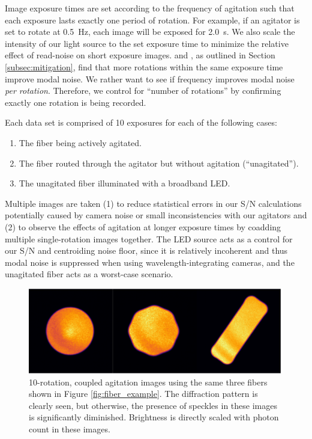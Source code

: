 Image exposure times are set according to the frequency of agitation such that each exposure lasts exactly one period of rotation. For example, if an agitator is set to rotate at \SI{0.5}{\hertz}, each image will be exposed for \SI{2.0}{\second}. We also scale the intensity of our light source to the set exposure time to minimize the relative effect of read-noise on short exposure images. \citet{baudrand_modal_2001} and \citet{lemke_modal_2011}, as outlined in Section \ref{subsec:mitigation}, find that more rotations within the same exposure time improve modal noise. We rather want to see if frequency improves modal noise \textit{per rotation}. Therefore, we control for ``number of rotations'' by confirming exactly one rotation is being recorded.

Each data set is comprised of 10 exposures for each of the following cases:
\begin{enumerate}
\item The fiber being actively agitated.
\item The fiber routed through the agitator but without agitation (``unagitated'').
\item The unagitated fiber illuminated with a broadband LED.
\end{enumerate}
Multiple images are taken (1) to reduce statistical errors in our S/N calculations potentially caused by camera noise or small inconsistencies with our agitators and (2) to observe the effects of agitation at longer exposure times by coadding multiple single-rotation images together. The LED source acts as a control for our S/N and centroiding noise floor, since it is relatively incoherent and thus modal noise is suppressed when using wavelength-integrating cameras, and the unagitated fiber acts as a worst-case scenario.

\begin{figure}
\centering
	\includegraphics[width=\columnwidth]{figures-2/fiber_improved.pdf}
	\caption[Fiber faces with mitigated modal noise]{10-rotation, coupled agitation images using the same three fibers shown in Figure \ref{fig:fiber_example}.  The diffraction pattern is clearly seen, but otherwise, the presence of speckles in these images is significantly diminished. Brightness is directly scaled with photon count in these images.}
\label{fig:fiber_improved}
\end{figure}

